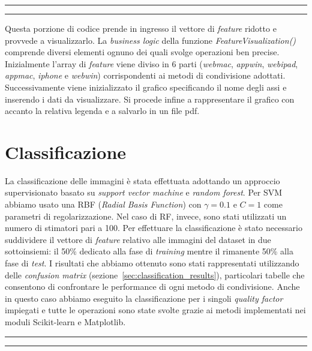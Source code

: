 \begin{center}
\rule{9cm}{0.5pt}
\end{center}

\begin{center}
\rule{9cm}{0.5pt}
\end{center}

Questa porzione di codice prende in ingresso il vettore di \textit{feature} ridotto e provvede a visualizzarlo. La \textit{business logic} della funzione \textit{FeatureVisualization()} comprende diversi elementi ognuno dei quali svolge operazioni ben precise. Inizialmente l'array di \textit{feature} viene diviso in 6 parti (\textit{web\textunderscore mac}, \textit{app\textunderscore win}, \textit{web\textunderscore ipad}, \textit{app\textunderscore mac}, \textit{iphone} e \textit{web\textunderscore win}) corrispondenti ai metodi di condivisione adottati. Successivamente viene inizializzato il grafico specificando il nome degli assi e inserendo i dati da visualizzare. Si procede infine a rappresentare il grafico con accanto la relativa legenda e a salvarlo in un file pdf.

\section{Classificazione}
\label{sec:classificazione}

La classificazione delle immagini è stata effettuata adottando un approccio supervisionato basato su \textit{support vector machine} e \textit{random forest}. Per SVM abbiamo usato una RBF (\textit{Radial Basis Function}) con $\gamma = 0.1$ e $C = 1$ come parametri di regolarizzazione. Nel caso di RF, invece, sono stati utilizzati un numero di stimatori pari a 100. Per effettuare la classificazione è stato necessario suddividere il vettore di \textit{feature} relativo alle immagini del dataset in due sottoinsiemi: il 50\% dedicato alla fase di \textit{training} mentre il rimanente 50\% alla fase di \textit{test}. I risultati che abbiamo ottenuto sono stati rappresentati utilizzando delle \textit{confusion matrix} (sezione~\ref{sec:classification_results}), particolari tabelle che consentono di confrontare le performance di ogni metodo di condivisione. Anche in questo caso abbiamo eseguito la classificazione per i singoli \textit{quality factor} impiegati e tutte le operazioni sono state svolte grazie ai metodi implementati nei moduli Scikit-learn e Matplotlib.\newpage

\begin{center}
\rule{9cm}{0.5pt}
\end{center}

\begin{center}
\rule{9cm}{0.5pt}
\end{center}

